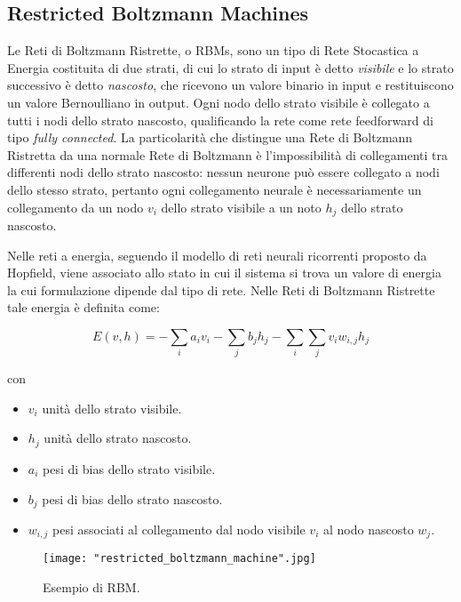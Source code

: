 \documentclass[10pt,letterpaper]{article}
\begin{document}
\subsection{Restricted Boltzmann Machines}
Le Reti di Boltzmann Ristrette, o RBMs, sono un tipo di Rete Stocastica a Energia costituita di due strati, di cui lo strato di input è detto \textit{visibile} e lo strato successivo è detto \textit{nascosto}, che ricevono un valore binario in input e restituiscono un valore Bernoulliano in output. Ogni nodo dello strato visibile è collegato a tutti i nodi dello strato nascosto, qualificando la rete come rete feedforward di tipo \textit{fully connected}. La particolarità che distingue una Rete di Boltzmann Ristretta da una normale Rete di Boltzmann è l'impossibilità di collegamenti tra differenti nodi dello strato nascosto: nessun neurone può essere collegato a nodi dello stesso strato, pertanto ogni collegamento neurale è necessariamente un collegamento da un nodo $v_i$ dello strato visibile a un noto $h_j$ dello strato nascosto. 

\newpage
Nelle reti a energia, seguendo il modello di reti neurali ricorrenti proposto da Hopfield, viene associato allo stato in cui il sistema si trova un valore di energia la cui formulazione dipende dal tipo di rete. Nelle Reti di Boltzmann Ristrette tale energia è definita come:

\begin{equation}
E(v,h) = -\sum_{i}a_i v_i - \sum_{j}b_j h_j - \sum_{i}\sum_{j}v_i w_{i,j} h_j
\end{equation}

con

\begin{itemize}
\item $v_i$ unità dello strato visibile.
\item $h_j$ unità dello strato nascosto.
\item $a_i$ pesi di bias dello strato visibile.
\item $b_j$ pesi di bias dello strato nascosto.
\item $w_{i,j}$ pesi associati al collegamento dal nodo visibile $v_i$ al nodo nascosto $w_j$.
\end{itemize}

\begin{figure}[h!]
	\centering
	\texttt{[image: "restricted\_boltzmann\_machine".jpg]}
	\caption{Esempio di RBM.}
	\label{fig:screen2}
\end{figure}
\end{document}
